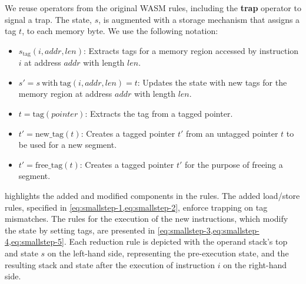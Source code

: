 We reuse operators from the original WASM rules, including the \textbf{trap} operator to signal a trap.
The state, $s$, is augmented with a storage mechanism that assigns a tag $t$, to each memory byte.
We use the following notation:

\begin{itemize}
    \item $s_{\text{tag}}(i, \mathit{addr}, \mathit{len})$: Extracts tags for a memory region accessed by instruction $i$ at address $\mathit{addr}$ with length $\mathit{len}$.
    \item $s' = s\ \text{with}\ \text{tag}(i, \mathit{addr}, \mathit{len}) = t$: Updates the state with new tags for the memory region at address $\mathit{addr}$ with length $\mathit{len}$.
    \item $t = \text{tag}(\mathit{pointer})$: Extracts the tag from a tagged pointer.
    \item $t' = \text{new\_tag}(t)$: Creates a tagged pointer $t'$ from an untagged pointer $t$ to be used for a new segment.
    \item $t' = \text{free\_tag}(t)$: Creates a tagged pointer $t'$ for the purpose of freeing a segment.
\end{itemize}

 highlights the added and modified components in the rules.
The added load/store rules, specified in \cref{eq:smallstep-1,eq:smallstep-2}, enforce trapping on tag mismatches.
The rules for the execution of the new instructions, which modify the state by setting tags, are presented in \cref{eq:smallstep-3,eq:smallstep-4,eq:smallstep-5}.
Each reduction rule is depicted with the operand stack's top and state $s$ on the left-hand side, representing the pre-execution state, and the resulting stack and state after the execution of instruction $i$ on the right-hand side.


